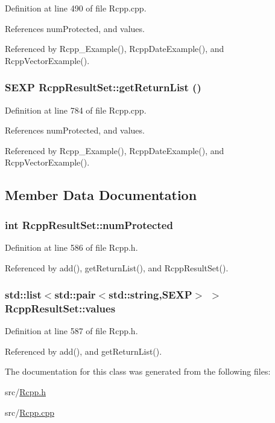 Definition at line 490 of file Rcpp.cpp.

References numProtected, and values.

Referenced by Rcpp\_\-Example(), RcppDateExample(), and RcppVectorExample().\hypertarget{classRcppResultSet_916989ff6c0ed1149a5f93fb6a532946}{
\subsubsection[{getReturnList}]{\setlength{\rightskip}{0pt plus 5cm}SEXP RcppResultSet::getReturnList ()}}
\label{classRcppResultSet_916989ff6c0ed1149a5f93fb6a532946}




Definition at line 784 of file Rcpp.cpp.

References numProtected, and values.

Referenced by Rcpp\_\-Example(), RcppDateExample(), and RcppVectorExample().

\subsection{Member Data Documentation}
\hypertarget{classRcppResultSet_19edd02ac05783f9b4fd840c22e74153}{
\subsubsection[{numProtected}]{\setlength{\rightskip}{0pt plus 5cm}int {\bf RcppResultSet::numProtected}}}
\label{classRcppResultSet_19edd02ac05783f9b4fd840c22e74153}




Definition at line 586 of file Rcpp.h.

Referenced by add(), getReturnList(), and RcppResultSet().\hypertarget{classRcppResultSet_509f3d779c88476dea89ade9c08d403f}{
\subsubsection[{values}]{\setlength{\rightskip}{0pt plus 5cm}std::list$<$std::pair$<$std::string,SEXP$>$ $>$ {\bf RcppResultSet::values}}}
\label{classRcppResultSet_509f3d779c88476dea89ade9c08d403f}




Definition at line 587 of file Rcpp.h.

Referenced by add(), and getReturnList().

The documentation for this class was generated from the following files:\begin{CompactItemize}
\item 
src/\hyperlink{Rcpp_8h}{Rcpp.h}\item 
src/\hyperlink{Rcpp_8cpp}{Rcpp.cpp}\end{CompactItemize}

